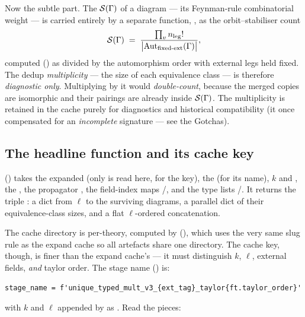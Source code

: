 Now the subtle part. The  $\mathcal{S}(\Gamma)$ of a diagram ---
its Feynman-rule combinatorial weight --- is carried entirely by a separate
function, , as the orbit--stabiliser count
\[
  \mathcal{S}(\Gamma)
  \;=\; \frac{\prod_v n_{\mathrm{leg}}!}{\big|\mathrm{Aut}_{\text{fixed-ext}}(\Gamma)\big|},
\]
computed () as
 divided by the automorphism order with external
legs held fixed. The dedup \emph{multiplicity} --- the size of each equivalence
class --- is therefore \emph{diagnostic only}. Multiplying by it would
\emph{double-count}, because the merged copies are isomorphic and their pairings
are already inside $\mathcal{S}(\Gamma)$. The multiplicity is retained in the cache
purely for diagnostics and historical compatibility (it once compensated for an
\emph{incomplete} signature --- see the Gotchas).

\subsection{The headline function and its cache key}

 () takes the expanded
 (only  is read here, for the key), the
 (for its name), $k$ and , the
, the propagator , the field-index maps
/, and the type lists /.
It returns the triple : a dict from $\ell$ to the surviving diagrams, a parallel dict of
their equivalence-class sizes, and a flat $\ell$-ordered concatenation.

The cache directory is per-theory, computed by 
(), which uses the very same slug rule as the expand
cache so all artefacts share one directory. The cache key, though, is finer
than the expand cache's --- it must distinguish $k$, $\ell$, external fields,
\emph{and} taylor order. The stage name () is:

\begin{lstlisting}
stage_name = f'unique_typed_mult_v3_{ext_tag}_taylor{ft.taylor_order}'
\end{lstlisting}

with $k$ and $\ell$ appended by  as .
Read the pieces:

